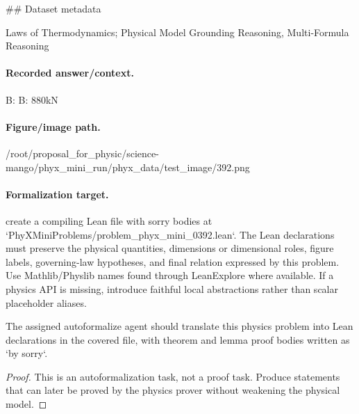 \#\# Dataset metadata

Laws of Thermodynamics; Physical Model Grounding Reasoning, Multi-Formula Reasoning

\paragraph{Recorded answer/context.}
B: B: 880kN

\paragraph{Figure/image path.}
/root/proposal\_for\_physic/science-mango/phyx\_mini\_run/phyx\_data/test\_image/392.png

\paragraph{Formalization target.}
create a compiling Lean file with sorry bodies at `PhyXMiniProblems/problem\_phyx\_mini\_0392.lean`. The Lean declarations must preserve the physical quantities, dimensions or dimensional roles, figure labels, governing-law hypotheses, and final relation expressed by this problem.
Use Mathlib/Physlib names found through LeanExplore where available. If a physics API is missing, introduce faithful local abstractions rather than scalar placeholder aliases.

\begin{theorem}
\label{thm:physics:phyx_mini_0392:target}
The assigned autoformalize agent should translate this physics problem into Lean declarations in the covered file, with theorem and lemma proof bodies written as `by sorry`.
\end{theorem}
\begin{proof}
This is an autoformalization task, not a proof task. Produce statements that can later be proved by the physics prover without weakening the physical model.
\end{proof}

